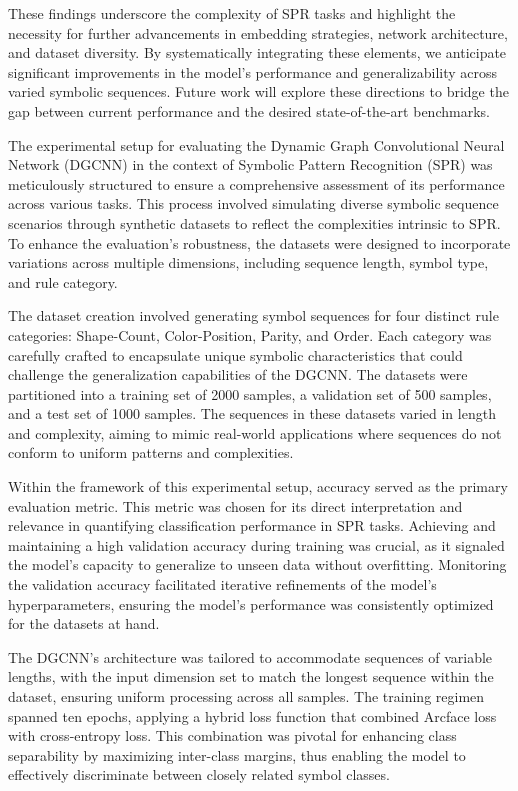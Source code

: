 \documentclass{article}
\begin{document}
These findings underscore the complexity of SPR tasks and highlight the necessity for further advancements in embedding strategies, network architecture, and dataset diversity. By systematically integrating these elements, we anticipate significant improvements in the model's performance and generalizability across varied symbolic sequences. Future work will explore these directions to bridge the gap between current performance and the desired state-of-the-art benchmarks.

The experimental setup for evaluating the Dynamic Graph Convolutional Neural Network (DGCNN) in the context of Symbolic Pattern Recognition (SPR) was meticulously structured to ensure a comprehensive assessment of its performance across various tasks. This process involved simulating diverse symbolic sequence scenarios through synthetic datasets to reflect the complexities intrinsic to SPR. To enhance the evaluation's robustness, the datasets were designed to incorporate variations across multiple dimensions, including sequence length, symbol type, and rule category.

The dataset creation involved generating symbol sequences for four distinct rule categories: Shape-Count, Color-Position, Parity, and Order. Each category was carefully crafted to encapsulate unique symbolic characteristics that could challenge the generalization capabilities of the DGCNN. The datasets were partitioned into a training set of 2000 samples, a validation set of 500 samples, and a test set of 1000 samples. The sequences in these datasets varied in length and complexity, aiming to mimic real-world applications where sequences do not conform to uniform patterns and complexities.

Within the framework of this experimental setup, accuracy served as the primary evaluation metric. This metric was chosen for its direct interpretation and relevance in quantifying classification performance in SPR tasks. Achieving and maintaining a high validation accuracy during training was crucial, as it signaled the model's capacity to generalize to unseen data without overfitting. Monitoring the validation accuracy facilitated iterative refinements of the model's hyperparameters, ensuring the model's performance was consistently optimized for the datasets at hand.

The DGCNN's architecture was tailored to accommodate sequences of variable lengths, with the input dimension set to match the longest sequence within the dataset, ensuring uniform processing across all samples. The training regimen spanned ten epochs, applying a hybrid loss function that combined Arcface loss with cross-entropy loss. This combination was pivotal for enhancing class separability by maximizing inter-class margins, thus enabling the model to effectively discriminate between closely related symbol classes.
\end{document}
